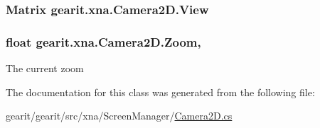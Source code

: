 \hypertarget{classgearit_1_1xna_1_1_camera2_d_ab2fbc971de185e14e0675169c2067cf4}{
\subsubsection[{View}]{\setlength{\rightskip}{0pt plus 5cm}Matrix gearit.\+xna.\+Camera2\+D.\+View\hspace{0.3cm}{\ttfamily [get]}}}\label{classgearit_1_1xna_1_1_camera2_d_ab2fbc971de185e14e0675169c2067cf4}
\hypertarget{classgearit_1_1xna_1_1_camera2_d_a3f3ff729da5335b0462906a6aceb928b}{
\subsubsection[{Zoom}]{\setlength{\rightskip}{0pt plus 5cm}float gearit.\+xna.\+Camera2\+D.\+Zoom\hspace{0.3cm}{\ttfamily [get]}, {\ttfamily [set]}}}\label{classgearit_1_1xna_1_1_camera2_d_a3f3ff729da5335b0462906a6aceb928b}


The current zoom 



The documentation for this class was generated from the following file\+:\begin{DoxyCompactItemize}
\item 
gearit/gearit/src/xna/\+Screen\+Manager/\hyperlink{_camera2_d_8cs}{Camera2\+D.\+cs}\end{DoxyCompactItemize}
